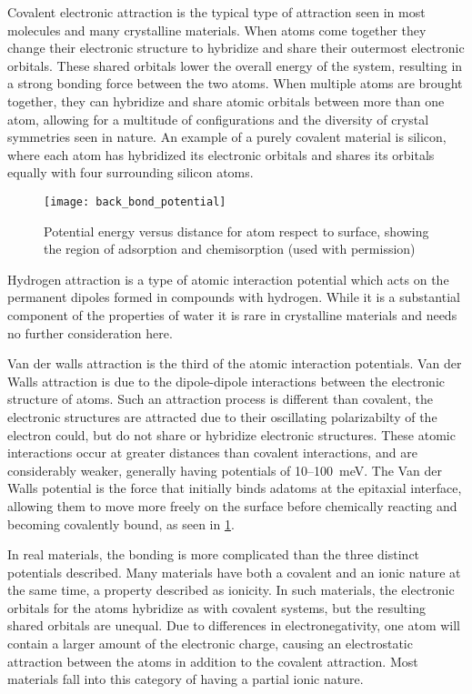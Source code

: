 Covalent electronic attraction is the typical type of attraction seen in most molecules and many crystalline materials. When atoms come together they change their electronic structure to hybridize and share their outermost electronic orbitals. These shared orbitals lower the overall energy of the system, resulting in a strong bonding force between the two atoms. When multiple atoms are brought together, they can hybridize and share atomic orbitals between more than one atom, allowing for a multitude of configurations and the diversity of crystal symmetries seen in nature. An example of a purely covalent material is silicon, where each atom has hybridized its electronic orbitals and shares its orbitals equally with four surrounding silicon atoms.
\begin{figure}
    \centering
    \texttt{[image: back\_bond\_potential]}
    \caption[Energy potentials between two atoms]{\label{fig:back_bond_potential}Potential energy versus distance for atom respect to surface, showing the region of adsorption and chemisorption\cite{ohring2001materials} (used with permission)}
\end{figure}

Hydrogen attraction is a type of atomic interaction potential which acts on the permanent dipoles formed in compounds with hydrogen. While it is a substantial component of the properties of water it is rare in crystalline materials and needs no further consideration here.

Van der walls attraction is the third of the atomic interaction potentials. Van der Walls attraction is due to the dipole-dipole interactions between the electronic structure of atoms. Such an attraction process is different than covalent, the electronic structures are attracted due to their oscillating polarizabilty of the electron could, but do not share or hybridize electronic structures. These atomic interactions occur at greater distances than covalent interactions, and are considerably weaker, generally having potentials of 10--100~meV. The Van der Walls potential is the force that initially binds adatoms at the epitaxial interface, allowing them to move more freely on the surface before chemically reacting and becoming covalently bound, as seen in \cref{fig:back_bond_potential}.

In real materials, the bonding is more complicated than the three distinct potentials described. Many materials have both a covalent and an ionic nature at the same time, a property described as ionicity. In such materials, the electronic orbitals for the atoms hybridize as with covalent systems, but the resulting shared orbitals are unequal. Due to differences in electronegativity, one atom will contain a larger amount of the electronic charge, causing an electrostatic attraction between the atoms in addition to the covalent attraction. Most materials fall into this category of having a partial ionic nature.

